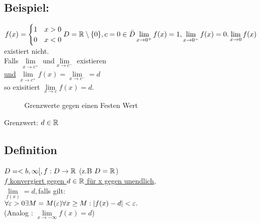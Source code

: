 \subsection[Beispiel]{Beispiel:}
$f(x) = \begin{cases}
1 & x>0\\
0 & x<0
\end{cases}
D = \mathbb{R} \setminus \{0\}, c = 0 \in \bar{D}\\
\lim\limits_{x \rightarrow 0^+} f(x) = 1, \lim\limits_{x \rightarrow 0^-} f(x) = 0.\\
\lim\limits_{x \rightarrow 0} f(x)$ existiert nicht.\\
Falls $\lim\limits_{x \rightarrow c^+}$ und$ \lim\limits_{x \rightarrow c^-}$ existieren\\
\underline{und} $\lim\limits_{x \rightarrow c^+} f(x) = \lim\limits_{x \rightarrow c^-} = d$\\
so exisitiert $\lim\limits_{x \rightarrow c} f(x) = d$.
\begin{figure}[h!]
\begin{minipage}[t]{\textwidth}
\begin{minipage}[t]{.5\textwidth}
\end{minipage}%
\begin{minipage}[t]{.5\textwidth}
\end{minipage}
\end{minipage}
\caption{Grenzwerte gegen einen Festen Wert}
\end{figure}
Grenzwert: $d \in \mathbb{R}$
\subsection{Definition}
$D = <b, \infty[ , f : D \rightarrow \mathbb{R}$
\hspace*{3cm} (z.B $D=\mathbb{R}$)\\
\underline{$f$ konvergiert gegen $d \in \mathbb{R}$ für x gegen unendlich},\\
$\lim\limits_{f(x)} = d, $falls gilt:\\
$\forall \varepsilon > 0 \exists M = M(\varepsilon) \forall x \geq M: \lvert f(x) - d \rvert < \varepsilon.$\\
(Analog : $\lim\limits_{x \rightarrow - \infty}f(x) = d$)

